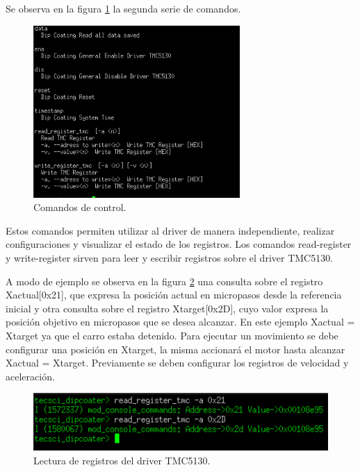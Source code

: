 Se observa en la figura \ref{fig:consola_comandos} la segunda serie de comandos. 

\begin{figure}[h!]
	\centering
	\includegraphics[width=0.7\textwidth]{./Figures/consola_3.png}
	\caption{Comandos de control.}
	\label{fig:consola_comandos}
\end{figure}

Estos comandos permiten utilizar al driver de manera independiente, realizar configuraciones y visualizar el estado de los registros.
Los comandos read-register y write-register sirven para leer y escribir registros sobre el driver TMC5130.

A modo de ejemplo se observa en la figura \ref{fig:comando_lectura} una consulta sobre el registro Xactual[0x21], que expresa la posición actual en micropasos desde la referencia inicial y otra consulta sobre el registro Xtarget[0x2D], cuyo valor expresa la posición objetivo en micropasos que se desea alcanzar. En este ejemplo Xactual = Xtarget ya que el carro estaba detenido. Para ejecutar un movimiento se debe configurar una posición en Xtarget, la misma accionará el motor hasta alcanzar Xactual = Xtarget. Previamente se deben configurar los registros de velocidad y aceleración.


\begin{figure}[h!]
	\centering
	\includegraphics[width=1\textwidth]{./Figures/consola_6.png}
	\caption{Lectura de registros del driver TMC5130.}
	\label{fig:comando_lectura}
\end{figure}


